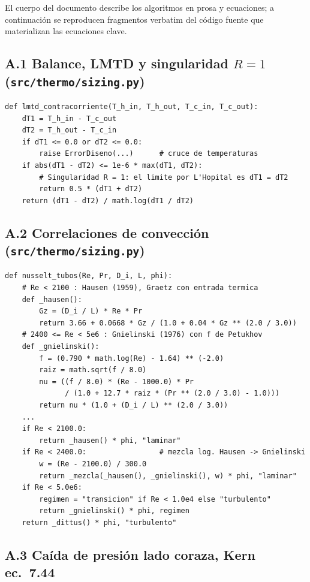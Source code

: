 \documentclass[11pt,a4paper]{article}
\begin{document}
El cuerpo del documento describe los algoritmos en prosa y ecuaciones; a
continuaci\'on se reproducen fragmentos verbatim del c\'odigo fuente que
materializan las ecuaciones clave.

\subsection*{A.1 Balance, LMTD y singularidad $R = 1$ (\texttt{src/thermo/sizing.py})}

\begin{verbatim}
def lmtd_contracorriente(T_h_in, T_h_out, T_c_in, T_c_out):
    dT1 = T_h_in - T_c_out
    dT2 = T_h_out - T_c_in
    if dT1 <= 0.0 or dT2 <= 0.0:
        raise ErrorDiseno(...)      # cruce de temperaturas
    if abs(dT1 - dT2) <= 1e-6 * max(dT1, dT2):
        # Singularidad R = 1: el limite por L'Hopital es dT1 = dT2
        return 0.5 * (dT1 + dT2)
    return (dT1 - dT2) / math.log(dT1 / dT2)
\end{verbatim}

\subsection*{A.2 Correlaciones de convecci\'on (\texttt{src/thermo/sizing.py})}

\begin{verbatim}
def nusselt_tubos(Re, Pr, D_i, L, phi):
    # Re < 2100 : Hausen (1959), Graetz con entrada termica
    def _hausen():
        Gz = (D_i / L) * Re * Pr
        return 3.66 + 0.0668 * Gz / (1.0 + 0.04 * Gz ** (2.0 / 3.0))
    # 2400 <= Re < 5e6 : Gnielinski (1976) con f de Petukhov
    def _gnielinski():
        f = (0.790 * math.log(Re) - 1.64) ** (-2.0)
        raiz = math.sqrt(f / 8.0)
        nu = ((f / 8.0) * (Re - 1000.0) * Pr
              / (1.0 + 12.7 * raiz * (Pr ** (2.0 / 3.0) - 1.0)))
        return nu * (1.0 + (D_i / L) ** (2.0 / 3.0))
    ...
    if Re < 2100.0:
        return _hausen() * phi, "laminar"
    if Re < 2400.0:                 # mezcla log. Hausen -> Gnielinski
        w = (Re - 2100.0) / 300.0
        return _mezcla(_hausen(), _gnielinski(), w) * phi, "laminar"
    if Re < 5.0e6:
        regimen = "transicion" if Re < 1.0e4 else "turbulento"
        return _gnielinski() * phi, regimen
    return _dittus() * phi, "turbulento"
\end{verbatim}

\subsection*{A.3 Ca\'ida de presi\'on lado coraza, Kern ec.~7.44}
\end{document}

